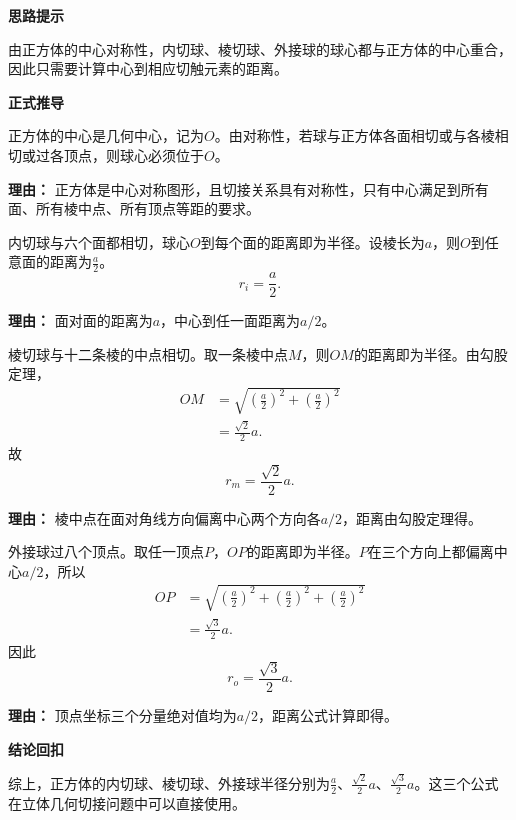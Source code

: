 \begin{proofbox}

	\textbf{\textcolor{CProof}{思路提示}}

	由正方体的中心对称性，内切球、棱切球、外接球的球心都与正方体的中心重合，因此只需要计算中心到相应切触元素的距离。

	\medskip
	\textbf{\textcolor{CProof}{正式推导}}
	\begin{description}[style=nextline, leftmargin=2.8em, labelsep=0.5em, itemsep=0.55em]
		\item[\textbf{步骤一（确定球心）：}] 正方体的中心是几何中心，记为$O$。由对称性，若球与正方体各面相切或与各棱相切或过各顶点，则球心必须位于$O$。
			\par\textbf{理由：}
			正方体是中心对称图形，且切接关系具有对称性，只有中心满足到所有面、所有棱中点、所有顶点等距的要求。

		\item[\textbf{步骤二（内切球半径）：}] 内切球与六个面都相切，球心$O$到每个面的距离即为半径。设棱长为$a$，则$O$到任意面的距离为$\frac{a}{2}$。
			\[
				r_i = \frac{a}{2}.
			\]
			\par\textbf{理由：}
			面对面的距离为$a$，中心到任一面距离为$a/2$。

		\item[\textbf{步骤三（棱切球半径）：}] 棱切球与十二条棱的中点相切。取一条棱中点$M$，则$OM$的距离即为半径。由勾股定理，
			\[
				\begin{aligned}
					OM &= \sqrt{\left(\frac{a}{2}\right)^2 + \left(\frac{a}{2}\right)^2} \\
					&= \frac{\sqrt{2}}{2}a.
			\end{aligned}
			\]
			故
			\[
				r_m = \frac{\sqrt{2}}{2}a.
			\]
			\par\textbf{理由：}
			棱中点在面对角线方向偏离中心两个方向各$a/2$，距离由勾股定理得。

		\item[\textbf{步骤四（外接球半径）：}] 外接球过八个顶点。取任一顶点$P$，$OP$的距离即为半径。$P$在三个方向上都偏离中心$a/2$，所以
			\[
				\begin{aligned}
					OP &= \sqrt{\left(\frac{a}{2}\right)^2 + \left(\frac{a}{2}\right)^2 + \left(\frac{a}{2}\right)^2} \\
					&= \frac{\sqrt{3}}{2}a.
			\end{aligned}
			\]
			因此
			\[
				r_o = \frac{\sqrt{3}}{2}a.
			\]
			\par\textbf{理由：}
			顶点坐标三个分量绝对值均为$a/2$，距离公式计算即得。
	\end{description}

	\medskip
	\textbf{\textcolor{CProof}{结论回扣}}

	综上，正方体的内切球、棱切球、外接球半径分别为$\frac{a}{2}$、$\frac{\sqrt{2}}{2}a$、$\frac{\sqrt{3}}{2}a$。这三个公式在立体几何切接问题中可以直接使用。

\end{proofbox}

